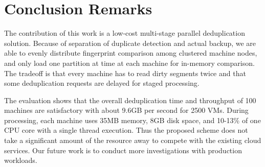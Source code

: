 \section{Conclusion Remarks}
\label{sect:final}

The contribution  of this work is a low-cost multi-stage parallel deduplication solution.
Because of separation  of duplicate detection and actual backup,
we are able to evenly distribute  fingerprint comparison among clustered machine
nodes, and only load one partition at time at each machine for in-memory comparison.
The tradeoff is that every machine has to read dirty segments twice 
and that some deduplication requests are delayed for staged processing.  

The evaluation shows that the overall 
deduplication time and throughput of 100 machines  are satisfactory with 
about 9.6GB per second for 2500 VMs. During processing, each machine uses 
35MB memory, 8GB disk space, and 10-13\% of one CPU core with a single thread  execution.
Thus the proposed  scheme does not take a significant  amount of the resource away
to compete with the existing cloud services.
Our future work is to conduct more investigations with production workloads.




